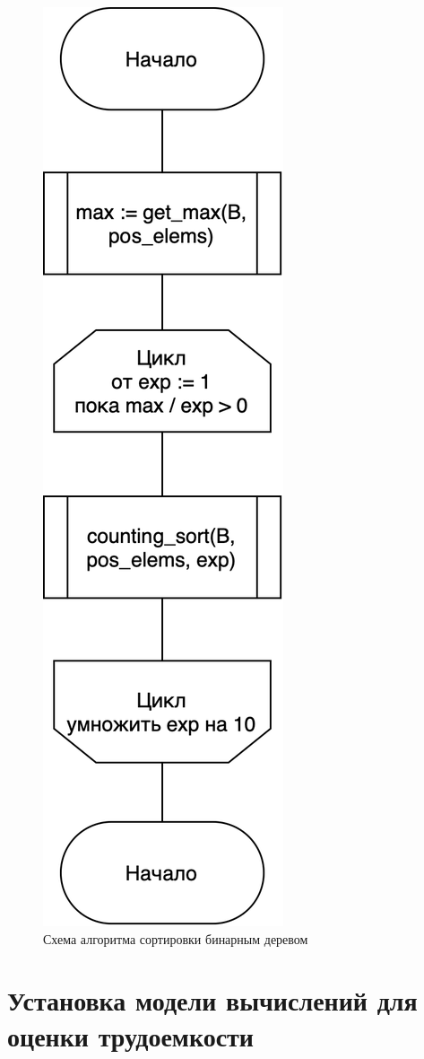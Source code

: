 \begin{figure}[h!]
    \centering
    \includegraphics[width=0.2\linewidth]{inc/img/radix}
    \caption{Схема алгоритма сортировки бинарным деревом}
    \label{fig:beads}
\end{figure}
\clearpage

\section{Установка модели вычислений для оценки трудоемкости}

